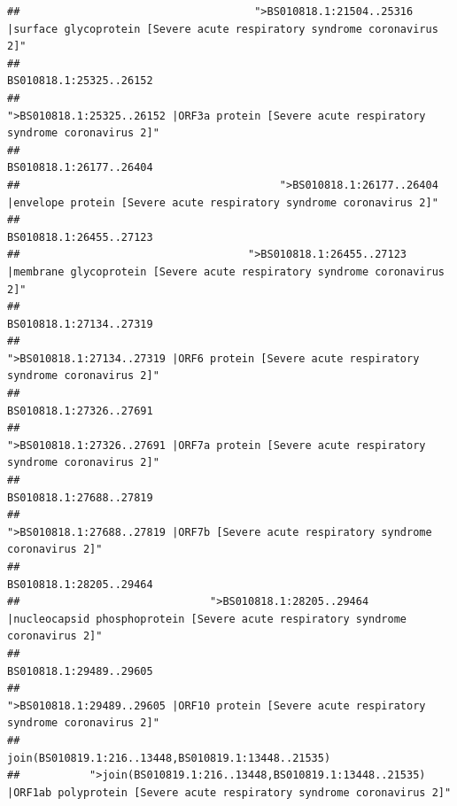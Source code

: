 \documentclass[
]{article}
\begin{document}
\begin{verbatim}
##                                     ">BS010818.1:21504..25316 |surface glycoprotein [Severe acute respiratory syndrome coronavirus 2]" 
##                                                                                                                BS010818.1:25325..26152 
##                                            ">BS010818.1:25325..26152 |ORF3a protein [Severe acute respiratory syndrome coronavirus 2]" 
##                                                                                                                BS010818.1:26177..26404 
##                                         ">BS010818.1:26177..26404 |envelope protein [Severe acute respiratory syndrome coronavirus 2]" 
##                                                                                                                BS010818.1:26455..27123 
##                                    ">BS010818.1:26455..27123 |membrane glycoprotein [Severe acute respiratory syndrome coronavirus 2]" 
##                                                                                                                BS010818.1:27134..27319 
##                                             ">BS010818.1:27134..27319 |ORF6 protein [Severe acute respiratory syndrome coronavirus 2]" 
##                                                                                                                BS010818.1:27326..27691 
##                                            ">BS010818.1:27326..27691 |ORF7a protein [Severe acute respiratory syndrome coronavirus 2]" 
##                                                                                                                BS010818.1:27688..27819 
##                                                    ">BS010818.1:27688..27819 |ORF7b [Severe acute respiratory syndrome coronavirus 2]" 
##                                                                                                                BS010818.1:28205..29464 
##                              ">BS010818.1:28205..29464 |nucleocapsid phosphoprotein [Severe acute respiratory syndrome coronavirus 2]" 
##                                                                                                                BS010818.1:29489..29605 
##                                            ">BS010818.1:29489..29605 |ORF10 protein [Severe acute respiratory syndrome coronavirus 2]" 
##                                                                                    join(BS010819.1:216..13448,BS010819.1:13448..21535) 
##           ">join(BS010819.1:216..13448,BS010819.1:13448..21535) |ORF1ab polyprotein [Severe acute respiratory syndrome coronavirus 2]" 

\end{verbatim}
\end{document}
